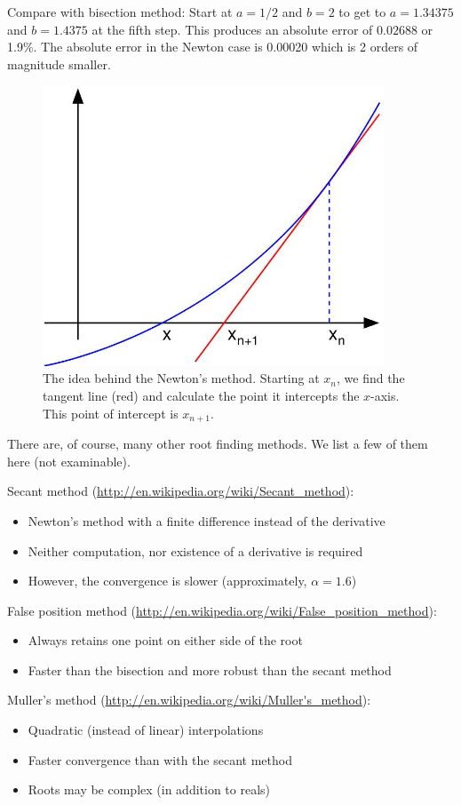 Compare with bisection method: Start at $a = 1/2$ and $b = 2$ to get to $a = 1.34375$ and $b = 1.4375$ at the fifth step.  This produces an absolute error of $0.02688$ or 1.9\%.  The absolute error in the Newton case is 0.00020 which is 2 orders of magnitude smaller.

\begin{figure}[htbp]
\includegraphics[width=4in]{figures/NewtonIteration.jpg}
\caption{The idea behind the Newton's method. Starting at $x_n$, we find the tangent line (red) and calculate the point it intercepts the $x$-axis.  This point of intercept is $x_{n+1}$.  }
\end{figure}

There are, of course, many other root finding methods.  We list a few of them here (not examinable).

 Secant method (\url{http://en.wikipedia.org/wiki/Secant\_method}):
\begin{itemize}\setlength{\itemsep}{0pt}
\item Newton's method with a finite difference instead of the derivative
\item Neither computation, nor existence of a derivative is required 
\item However, the convergence is slower (approximately, $\alpha=1.6$)
\end{itemize}
False position method (\url{http://en.wikipedia.org/wiki/False\_position\_method}):
\begin{itemize}\setlength{\itemsep}{0pt}
\item Always retains one point on either side of the root 
\item Faster than the bisection and more robust than the 
secant method
\end{itemize}
Muller's method  (\url{http://en.wikipedia.org/wiki/Muller's\_method}):
\begin{itemize}\setlength{\itemsep}{0pt}
\item Quadratic (instead of linear) interpolations
\item Faster convergence than with the secant method
\item Roots may be complex (in addition to reals)
\end{itemize}
\newpage

